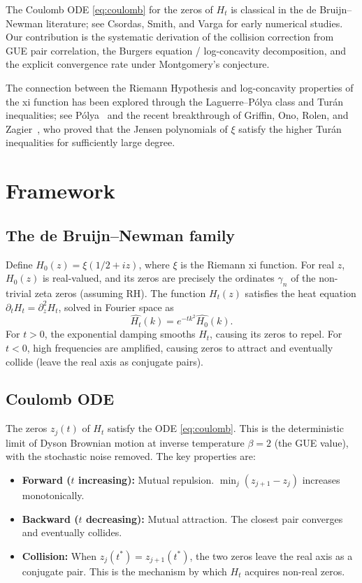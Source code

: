 \documentclass[11pt,a4paper]{article}
\begin{document}
The Coulomb ODE \eqref{eq:coulomb} for the zeros of $H_t$ is
classical in the de Bruijn--Newman literature; see Csordas, Smith, and
Varga \cite{csv1994} for early numerical studies. Our contribution is
the systematic derivation of the collision correction from GUE pair
correlation, the Burgers equation / log-concavity decomposition, and
the explicit convergence rate under Montgomery's conjecture.

The connection between the Riemann Hypothesis and log-concavity
properties of the xi function has been explored through the
Laguerre--P\'olya class and Tur\'an inequalities; see
P\'olya~\cite{polya1927} and the recent breakthrough of Griffin, Ono,
Rolen, and Zagier~\cite{gorz2019}, who proved that the Jensen
polynomials of $\xi$ satisfy the higher Tur\'an inequalities for
sufficiently large degree.

\section{Framework}\label{sec:framework}

\subsection{The de Bruijn--Newman family}

Define $H_0(z) = \xi(1/2 + iz)$, where $\xi$ is the Riemann xi
function. For real $z$, $H_0(z)$ is real-valued, and its zeros are
precisely the ordinates $\gamma_n$ of the non-trivial zeta zeros
(assuming RH). The function $H_t(z)$ satisfies the heat equation
$\partial_t H_t = \partial_z^2 H_t$, solved in Fourier space as
\begin{equation}\label{eq:heat-fourier}
  \widehat{H_t}(k) = e^{-tk^2}\widehat{H_0}(k).
\end{equation}
For $t > 0$, the exponential damping smooths $H_t$, causing its zeros
to repel. For $t < 0$, high frequencies are amplified, causing zeros
to attract and eventually collide (leave the real axis as conjugate
pairs).

\subsection{Coulomb ODE}

The zeros $z_j(t)$ of $H_t$ satisfy the ODE
\eqref{eq:coulomb}. This is the deterministic limit of Dyson Brownian
motion at inverse temperature $\beta = 2$ (the GUE value), with the
stochastic noise removed. The key properties are:
\begin{itemize}
  \item \textbf{Forward ($t$ increasing):} Mutual repulsion.
    $\min_j(z_{j+1} - z_j)$ increases monotonically.
  \item \textbf{Backward ($t$ decreasing):} Mutual attraction.
    The closest pair converges and eventually collides.
  \item \textbf{Collision:} When $z_j(t^*) = z_{j+1}(t^*)$, the two
    zeros leave the real axis as a conjugate pair. This is the
    mechanism by which $H_t$ acquires non-real zeros.
\end{itemize}
\end{document}
